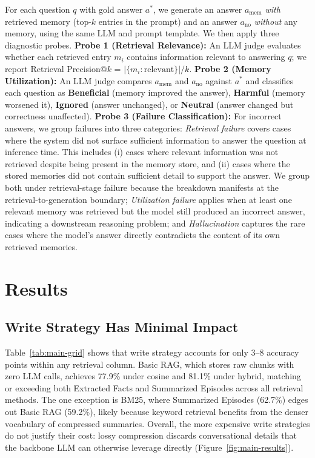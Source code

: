 \documentclass{article} %
\begin{document}
For each question $q$ with gold answer $a^*$, we generate an answer $a_\text{mem}$ \emph{with} retrieved memory (top-$k$ entries in the prompt) and an answer $a_\text{no}$ \emph{without} any memory, using the same LLM and prompt template. We then apply three diagnostic probes. \textbf{Probe 1 (Retrieval Relevance):} An LLM judge evaluates whether each retrieved entry $m_i$ contains information relevant to answering $q$; we report Retrieval Precision@$k$ = $|\{m_i : \text{relevant}\}| / k$. \textbf{Probe 2 (Memory Utilization):} An LLM judge compares $a_\text{mem}$ and $a_\text{no}$ against $a^*$ and classifies each question as \textbf{Beneficial} (memory improved the answer), \textbf{Harmful} (memory worsened it), \textbf{Ignored} (answer unchanged), or \textbf{Neutral} (answer changed but correctness unaffected). \textbf{Probe 3 (Failure Classification):} For incorrect answers, we group failures into three categories: \emph{Retrieval failure} covers cases where the system did not surface sufficient information to answer the question at inference time. This includes (i) cases where relevant information was not retrieved despite being present in the memory store, and (ii) cases where the stored memories did not contain sufficient detail to support the answer. We group both under retrieval-stage failure because the breakdown manifests at the retrieval-to-generation boundary; \emph{Utilization failure} applies when at least one relevant memory was retrieved but the model still produced an incorrect answer, indicating a downstream reasoning problem; and \emph{Hallucination} captures the rare cases where the model's answer directly contradicts the content of its own retrieved memories.

\section{Results}

\subsection{Write Strategy Has Minimal Impact}
Table~\ref{tab:main-grid} shows that write strategy accounts for only 3--8 accuracy points within any retrieval column. Basic RAG, which stores raw chunks with zero LLM calls, achieves 77.9\% under cosine and 81.1\% under hybrid, matching or exceeding both Extracted Facts and Summarized Episodes across all retrieval methods. The one exception is BM25, where Summarized Episodes (62.7\%) edges out Basic RAG (59.2\%), likely because keyword retrieval benefits from the denser vocabulary of compressed summaries. Overall, the more expensive write strategies do not justify their cost: lossy compression discards conversational details that the backbone LLM can otherwise leverage directly (Figure~\ref{fig:main-results}).
\end{document}
